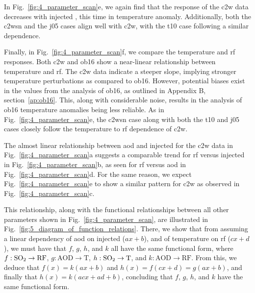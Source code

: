 \documentclass{ametsocV6.1}
\newcommand{\iso}[1][i]{{#1}njected \ce{SO2}}
\begin{document}
In Fig.~\ref{fig:4_parameter_scan}e, we again find that the response of the \gls{c2w}
data decreases with \iso{}, this time in temperature anomaly. Additionally, both the
\gls{c2wsn} and the \gls{j05} cases align well with \gls{c2w}, with the \gls{t10} case
following a similar dependence.

Finally, in Fig.~\ref{fig:4_parameter_scan}f, we compare the temperature and \gls{rf}
responses. Both \gls{c2w} and \gls{ob16} show a near-linear relationship between
temperature and \gls{rf}. The \gls{c2w} data indicate a steeper slope, implying stronger
temperature perturbations as compared to \gls{ob16}. However, potential biases exist in
the values from the analysis of \gls{ob16}, as outlined in Appendix B,
section~\ref{ap:ob16}. This, along with considerable noise, results in the analysis of
\gls{ob16} temperature anomalies being less reliable. As in
Fig.~\ref{fig:4_parameter_scan}e, the \gls{c2wsn} case along with both the \gls{t10} and
\gls{j05} cases closely follow the temperature to \gls{rf} dependence of \gls{c2w}.

The almost linear relationship between \gls{aod} and \iso{} for the \gls{c2w} data in
Fig.~\ref{fig:4_parameter_scan}a suggests a comparable trend for \gls{rf} versus \iso{}
in Fig.~\ref{fig:4_parameter_scan}b, as seen for \gls{rf} versus \gls{aod} in
Fig.~\ref{fig:4_parameter_scan}d. For the same reason, we expect
Fig.~\ref{fig:4_parameter_scan}e to show a similar pattern for \gls{c2w} as observed in
Fig.~\ref{fig:4_parameter_scan}c.

This relationship, along with the functional relationships between all other parameters
shown in Fig.~\ref{fig:4_parameter_scan}, are illustrated in
Fig.~\ref{fig:5_diagram_of_function_relations}. There, we show that from assuming a
linear dependency of \gls{aod} on \iso{} (\(ax+b\)), and of temperature on \gls{rf}
(\(cx+d\)), we must have that \(f\), \(g\), \(h\), and \(k\) all have the same
functional form, where \(f: \ce{SO2} \to \mathrm{RF}\), \(g: \mathrm{AOD} \to
\mathrm{T}\), \(h: \ce{SO2} \to \mathrm{T}\), and \(k: \mathrm{AOD} \to \mathrm{RF}\).
From this, we deduce that \(f(x)=k(ax+b)\) and \(h(x)=f(cx+d)=g(ax+b)\), and finally
that \(h(x)=k(acx+ad+b)\), concluding that \(f\), \(g\), \(h\), and \(k\) have the same
functional form.
\end{document}
